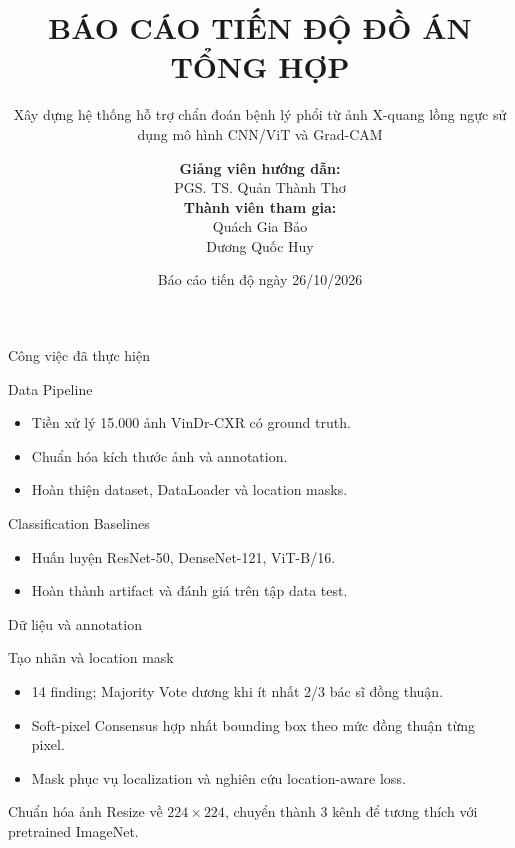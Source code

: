 \documentclass[10pt]{beamer}
\title[Báo cáo tiến độ ĐATH]{BÁO CÁO TIẾN ĐỘ ĐỒ ÁN TỔNG HỢP}
\subtitle{Xây dựng hệ thống hỗ trợ chẩn đoán bệnh lý phổi từ ảnh X-quang lồng ngực sử dụng mô hình CNN/ViT và Grad-CAM}
\author[Bảo, Huy]{
    \textbf{Giảng viên hướng dẫn:}\\
    \vspace{0.1cm}
    PGS. TS. Quản Thành Thơ\\
    \vspace{0.5cm}
    \textbf{Thành viên tham gia:}\\
    \vspace{0.1cm}
    Quách Gia Bảo\\
    Dương Quốc Huy\\
}
\date{Báo cáo tiến độ ngày 26/10/2026}
\begin{document}
\begin{frame}
    \titlepage
\end{frame}

\begin{frame}{Công việc đã thực hiện}
    \begin{block}{Data Pipeline}
        \small
        \begin{itemize}
            \item Tiền xử lý 15.000 ảnh VinDr-CXR có ground truth.
            \item Chuẩn hóa kích thước ảnh và annotation.
            \item Hoàn thiện dataset, DataLoader và location masks.
        \end{itemize}
    \end{block}
    \vspace{0.2cm}
    \begin{block}{Classification Baselines}
        \small
        \begin{itemize}
            \item Huấn luyện ResNet-50, DenseNet-121, ViT-B/16.
            \item Hoàn thành artifact và đánh giá trên tập data test.
        \end{itemize}
    \end{block}
\end{frame}

\begin{frame}{Dữ liệu và annotation}
    \begin{block}{Tạo nhãn và location mask}
        \small
        \begin{itemize}
            \item 14 finding; Majority Vote dương khi ít nhất 2/3 bác sĩ đồng thuận.
            \item Soft-pixel Consensus hợp nhất bounding box theo mức đồng thuận từng pixel.
            \item Mask phục vụ localization và nghiên cứu location-aware loss.
        \end{itemize}
    \end{block}
    \vspace{0.15cm}
    \begin{block}{Chuẩn hóa ảnh}
        \small Resize về $224\times224$, chuyển thành 3 kênh để tương thích với pretrained ImageNet.
    \end{block}
\end{frame}
\end{document}
